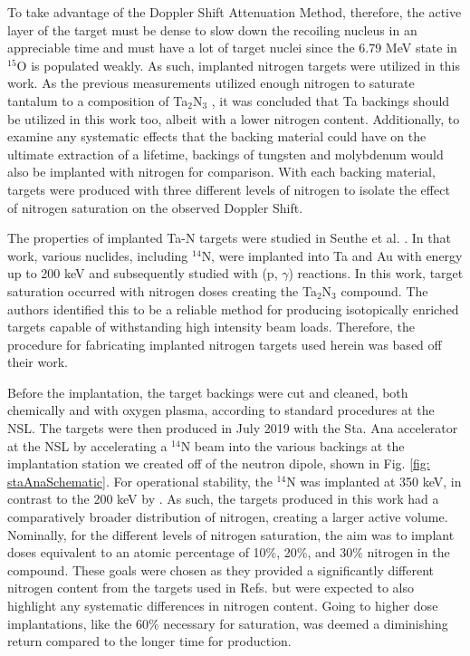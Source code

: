 To take advantage of the Doppler Shift Attenuation Method, therefore, the active layer of the target must be dense to slow down the recoiling nucleus in an appreciable time and must have a lot of target nuclei since the 6.79 MeV state in $^{15}$O is populated weakly. As such, implanted nitrogen targets were utilized in this work. As the previous measurements utilized enough nitrogen to saturate tantalum to a composition of Ta$_{2}$N$_{3}$ \cite{Bertone2001, Schurmann2008}, it was concluded that Ta backings should be utilized in this work too, albeit with a lower nitrogen content. Additionally, to examine any systematic effects that the backing material could have on the ultimate extraction of a lifetime, backings of tungsten and molybdenum would also be implanted with nitrogen for comparison. With each backing material, targets were produced with three different levels of nitrogen to isolate the effect of nitrogen saturation on the observed Doppler Shift. 

The properties of implanted Ta-N targets were studied in Seuthe et al. \cite{Seuthe1987}. In that work, various nuclides, including $^{14}$N, were implanted into Ta and Au with energy up to 200 keV and subsequently studied with (p, $\gamma$) reactions. In this work, target saturation occurred with nitrogen doses creating the Ta$_{2}$N$_{3}$ compound. The authors identified this to be a reliable method for producing isotopically enriched targets capable of withstanding high intensity beam loads. Therefore, the procedure for fabricating implanted nitrogen targets used herein was based off their work.

Before the implantation, the target backings were cut and cleaned, both chemically and with oxygen plasma, according to standard procedures at the NSL. The targets were then produced in July 2019 with the Sta. Ana accelerator at the NSL by accelerating a $^{14}$N beam into the various backings at the implantation station we created off of the neutron dipole, shown in Fig. \ref{fig: staAnaSchematic}. For operational stability, the $^{14}$N was implanted at 350 keV, in contrast to the 200 keV by \cite{Seuthe1987}. As such, the targets produced in this work had a comparatively broader distribution of nitrogen, creating a larger active volume. Nominally, for the different levels of nitrogen saturation, the aim was to implant doses equivalent to an atomic percentage of 10\%, 20\%, and 30\% nitrogen in the compound. These goals were chosen as they provided a significantly different nitrogen content from the targets used in Refs. \cite{Bertone2001, Schurmann2008} but were expected to also highlight any systematic differences in nitrogen content. Going to higher dose implantations, like the 60\% necessary for saturation, was deemed a diminishing return compared to the longer time for production.

